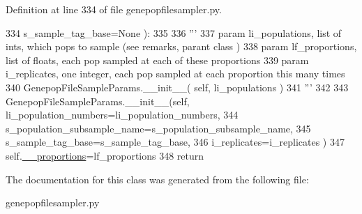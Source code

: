 Definition at line 334 of file genepopfilesampler.\+py.


\begin{DoxyCode}
334             s\_sample\_tag\_base=\textcolor{keywordtype}{None} ):
335 
336         \textcolor{stringliteral}{'''}
337 \textcolor{stringliteral}{        param li\_populations, list of ints, which pops to sample (see remarks, parant class )}
338 \textcolor{stringliteral}{        param lf\_proportions, list of floats, each pop sampled at each of these proportions}
339 \textcolor{stringliteral}{        param i\_replicates, one integer, each pop sampled at each proportion this many times}
340 \textcolor{stringliteral}{        GenepopFileSampleParams.\_\_init\_\_( self, li\_populations )}
341 \textcolor{stringliteral}{        '''}
342 
343         GenepopFileSampleParams.\_\_init\_\_(self, li\_population\_numbers=li\_population\_numbers, 
344                                             s\_population\_subsample\_name=s\_population\_subsample\_name,
345                                             s\_sample\_tag\_base=s\_sample\_tag\_base,
346                                             i\_replicates=i\_replicates )
347         self.\hyperlink{classnegui_1_1genepopfilesampler_1_1GenepopFileSampleParamsProportion_aa8dd8cef783da4e9bdb7c550e56382fd}{\_\_proportions}=lf\_proportions
348         \textcolor{keywordflow}{return}
\end{DoxyCode}


The documentation for this class was generated from the following file\+:\begin{DoxyCompactItemize}
\item 
genepopfilesampler.\+py\end{DoxyCompactItemize}
